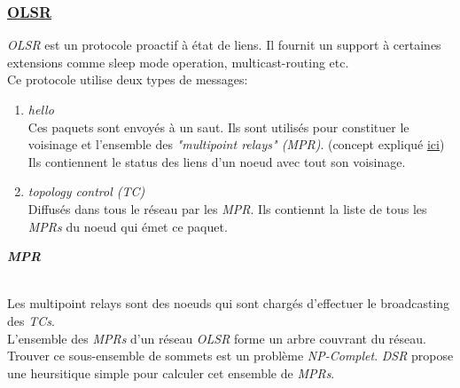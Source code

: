 \documentclass[a4paper, 12pt]{report}
\begin{document}
    \vspace{2cm}
    \subsubsection{\underline{OLSR}}%
        \textit{OLSR} est un protocole proactif à état de liens. Il fournit un support à certaines extensions comme
        sleep mode operation, multicast-routing etc.\\
        Ce protocole utilise deux types de messages:\\
        \begin{enumerate}
            \item \textit{hello}\\
                Ces paquets sont envoyés à un saut. Ils sont utilisés pour constituer le voisinage et
                l'ensemble des \textit{"multipoint relays" (MPR)}. (concept expliqué  \hyperlink{mpr}{ici})\\
                Ils contiennent le status des liens d'un noeud avec tout son voisinage.
            \item \textit{topology control (TC)}\\
                Diffusés dans tous le réseau par les \textit{MPR}. Ils contiennt la liste de tous les \textit{MPRs}
                du noeud qui émet ce paquet.
        \end{enumerate}
        \hypertarget{mpr}{\textit{\textbf{MPR}}}\\
        Les multipoint relays sont des noeuds qui sont chargés d'effectuer le broadcasting des \textit{TCs}. \\
        L'ensemble des \textit{MPRs} d'un réseau \textit{OLSR} forme un arbre couvrant du réseau. Trouver ce sous-ensemble de sommets
        est un problème \textit{NP-Complet}. \textit{DSR} propose une heursitique simple pour calculer cet ensemble de \textit{MPRs}.\\
        
\end{document}
